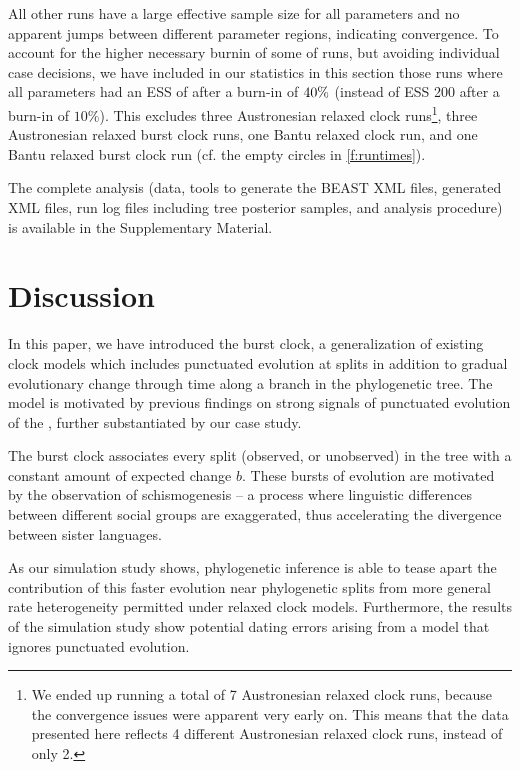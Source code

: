 \documentclass[]{rsos}%
\begin{document}
All other runs have a large effective sample size for all parameters and no
apparent jumps between different parameter regions, indicating convergence. To
account for the higher necessary burnin of some of runs, but avoiding individual
case decisions, we have included in our statistics in this section those runs
where all parameters had an ESS of \ess after a burn-in of $40\%$ (instead of
ESS 200 after a burn-in of $10\%$). This excludes three Austronesian relaxed
clock runs\footnote{We ended up running a total of 7 Austronesian relaxed clock
  runs, because the convergence issues were apparent very early on. This means
  that the data presented here reflects 4 different Austronesian relaxed clock
  runs, instead of only 2.}, three Austronesian relaxed burst clock runs, one
Bantu relaxed clock run, and one Bantu relaxed burst clock run (cf. the empty
circles in \cref{f:runtimes}).

The complete analysis (data, tools to generate the BEAST XML files, generated XML files,
run log files including tree posterior samples, and analysis procedure) is
available in the Supplementary Material.

\section{Discussion}\label{s:discussion}

In this paper, we have introduced the burst clock, a generalization of existing clock models which includes punctuated evolution at splits in addition to gradual evolutionary change through time along a branch in the phylogenetic tree. The model is motivated by previous findings on strong signals of punctuated evolution of the \parencite{atkinson2008languages}, further substantiated by our case study. 

The burst clock associates every split (observed, or unobserved) in the tree with a constant amount of expected change $b$. These bursts of evolution are motivated by the observation of schismogenesis -- a process where linguistic differences between different social groups are exaggerated, thus accelerating the divergence between sister languages.

As our simulation study shows, phylogenetic inference is able to tease apart the
contribution of this faster evolution near phylogenetic splits from more general rate heterogeneity permitted under relaxed clock models. Furthermore, the results of the simulation study show potential dating errors arising from a model that ignores punctuated evolution.
\end{document}

